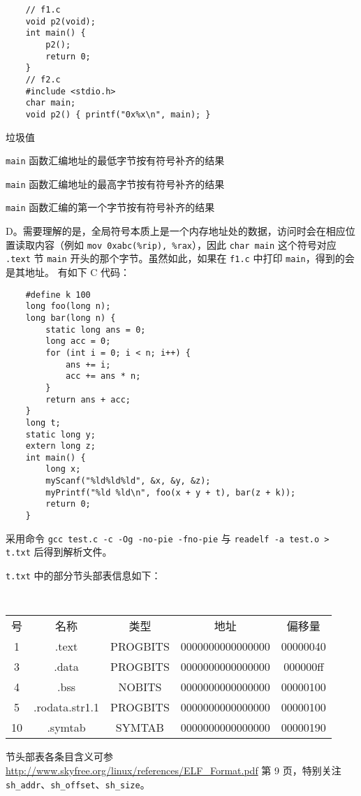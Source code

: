 \begin{problems}
\begin{verbatim}
    // f1.c
    void p2(void);
    int main() {
        p2();
        return 0;
    }
    // f2.c
    #include <stdio.h>
    char main;
    void p2() { printf("0x%x\n", main); }
        \end{verbatim}
        \begin{choices}
            \item 垃圾值
            \item \verb|main| 函数汇编地址的最低字节按有符号补齐的结果
            \item \verb|main| 函数汇编地址的最高字节按有符号补齐的结果
            \item \verb|main| 函数汇编的第一个字节按有符号补齐的结果
        \end{choices}
        \sol D。需要理解的是，全局符号本质上是一个内存地址处的数据，访问时会在相应位置读取内容（例如 \verb|mov 0xabc(%rip), %rax|），因此 \verb|char main| 这个符号对应 \verb|.text| 节 \verb|main| 开头的那个字节。虽然如此，如果在 \verb|f1.c| 中打印 \verb|main|，得到的会是其地址。
        \pro 有如下 C 代码：
        \begin{verbatim}
    #define k 100
    long foo(long n);
    long bar(long n) {
        static long ans = 0;
        long acc = 0;
        for (int i = 0; i < n; i++) {
            ans += i;
            acc += ans * n;
        }
        return ans + acc;
    } 
    long t;
    static long y;
    extern long z;
    int main() {
        long x;
        myScanf("%ld%ld%ld", &x, &y, &z);
        myPrintf("%ld %ld\n", foo(x + y + t), bar(z + k));
        return 0;
    }
        \end{verbatim}
        采用命令 \verb|gcc test.c -c -Og -no-pie -fno-pie| 与 \verb|readelf -a test.o > t.txt| 后得到解析文件。

        \verb|t.txt| 中的部分节头部表信息如下：
        \begin{table}[H]
            \tt
            \centering
            \begin{tabular}{|ccccc|}
                \hline
                号 & 名称 & 类型 & 地址 & 偏移量 \\
                1 & .text & PROGBITS & 0000000000000000 & 00000040 \\
                3 & .data & PROGBITS & 0000000000000000 & 000000ff \\
                4 & .bss & NOBITS & 0000000000000000 & 00000100 \\
                5 & .rodata.str1.1 & PROGBITS & 0000000000000000 & 00000100 \\
                10 & .symtab & SYMTAB & 0000000000000000 & 00000190 \\ \hline
            \end{tabular}
        \end{table}
        \begin{hint}
            节头部表各条目含义可参 \url{http://www.skyfree.org/linux/references/ELF\_Format.pdf} 第 9 页，特别关注 \verb|sh_addr|、\verb|sh_offset|、\verb|sh_size|。
        \end{hint}


\end{problems}
